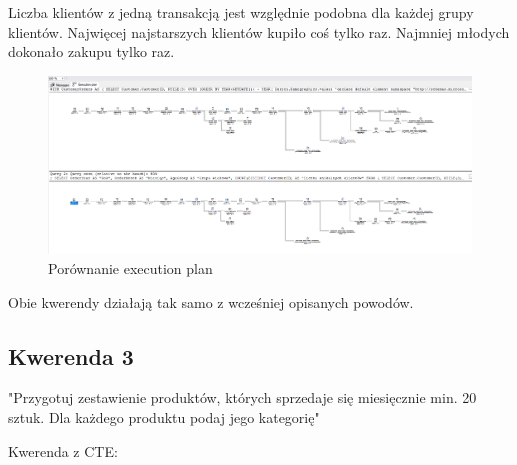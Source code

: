 \documentclass[a4paper,12pt]{article}
\begin{document}
Liczba klientów z jedną transakcją jest względnie podobna dla każdej grupy klientów. Najwięcej najstarszych klientów kupiło coś tylko raz. Najmniej młodych dokonało zakupu tylko raz.

\begin{figure}[H]
	\centering
	\includegraphics[width=1.0\textwidth]{images/2_execution_plan.png}
	\caption{Porównanie execution plan}
\end{figure}

Obie kwerendy działają tak samo z wcześniej opisanych powodów.

\subsection{Kwerenda 3}

"Przygotuj zestawienie produktów, których sprzedaje się miesięcznie min. 20 sztuk. Dla każdego produktu podaj jego kategorię"

Kwerenda z CTE:
\end{document}
